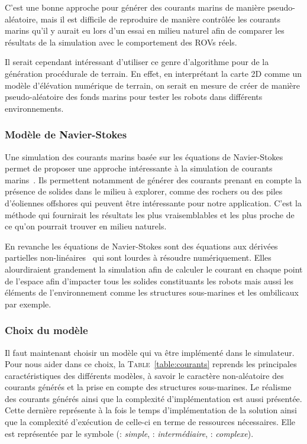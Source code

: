 				C'est une bonne approche pour générer des courants marins de manière pseudo-aléatoire, mais il est difficile de reproduire de manière contrôlée les courants marins qu'il y aurait eu lors d'un essai en milieu naturel afin de comparer les résultats de la simulation avec le comportement des \gls{ROV}s réels.
				
				Il serait cependant intéressant d'utiliser ce genre d'algorithme pour de la génération procédurale de terrain. En effet, en interprétant la carte 2D comme un modèle d'élévation numérique de terrain, on serait en mesure de créer de manière pseudo-aléatoire des fonds marins pour tester les robots dans différents environnements.

			\subsubsection{Modèle de Navier-Stokes}

				Une simulation des courants marins basée sur les équations de Navier-Stokes permet de proposer une approche intéressante à la simulation de courants marins~\cite{Garau2006current}. Ils permettent notamment de générer des courants prenant en compte la présence de solides dans le milieu à explorer, comme des rochers ou des piles d'éoliennes offshores qui peuvent être intéressante pour notre application. C'est la méthode qui fournirait les résultats les plus vraisemblables et les plus proche de ce qu'on pourrait trouver en milieu naturels.

				En revanche les équations de Navier-Stokes sont des équations aux dérivées partielles non-linéaires~\cite{hinch2012hydrodynamique} qui sont lourdes à résoudre numériquement. Elles alourdiraient grandement la simulation afin de calculer le courant en chaque point de l'espace afin d'impacter tous les solides constituants les robots mais aussi les éléments de l'environnement comme les structures sous-marines et les ombilicaux par exemple.

			\subsubsection{Choix du modèle}

				Il faut maintenant choisir un modèle qui va être implémenté dans le simulateur. Pour nous aider dans ce choix, la \textsc{Table}~\ref{table:courants} reprends les principales caractéristiques des différents modèles, à savoir le caractère non-aléatoire des courants générés et la prise en compte des structures sous-marines. Le réalisme des courants générés ainsi que la complexité d'implémentation est aussi présentée. Cette dernière représente à la fois le temps d'implémentation de la solution ainsi que la complexité d'exécution de celle-ci en terme de ressources nécessaires. Elle est représentée par le symbole \pmark (\pmark : \textit{simple}, \pmark \pmark : \textit{intermédiaire}, \pmark \pmark \pmark : \textit{complexe}).

